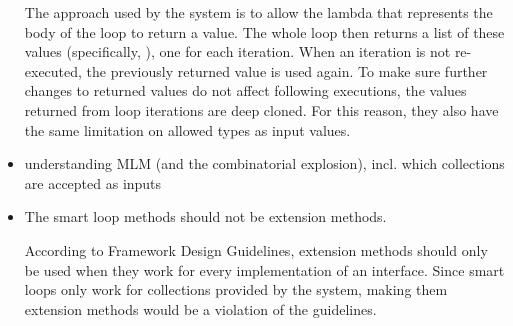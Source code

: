 \begin{itemize}
The approach used by the system is to allow the lambda that represents the body of the loop to return a value. The whole loop then returns a list of these values (specifically, ), one for each iteration. When an iteration is not re-executed, the previously returned value is used again. To make sure further changes to returned values do not affect following executions, the values returned from loop iterations are deep cloned. For this reason, they also have the same limitation on allowed types as input values.

\item understanding MLM (and the combinatorial explosion), incl. which collections are accepted as inputs

\item The smart loop methods should not be extension methods.

\nopagebreak

According to Framework Design Guidelines, extension methods should only be used when they work for every implementation of an interface. \cite{fdg-extension-methods} Since smart loops only work for collections provided by the system, making them extension methods would be a violation of the guidelines.

\end{itemize}

